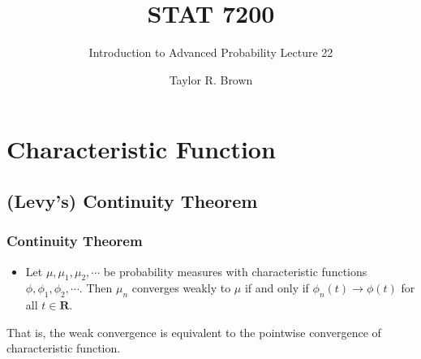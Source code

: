 \documentclass[handout]{beamer}
\title{STAT 7200}
\subtitle{Introduction to Advanced Probability \newline Lecture 22}
\author{Taylor R. Brown}
\institute{}
\date{}
\begin{document}
\frame{\titlepage}


\section[Outline]{}
\frame{\tableofcontents}



\section{Characteristic Function}


\subsection{(Levy's) Continuity Theorem} 


\frame
{
  \frametitle{Continuity Theorem} 

 \begin{itemize}
 
            \item<1->[] \begin{Theorem} Let $\mu, \mu_1, \mu_2,\cdots$  be probability measures with characteristic functions $\phi, \phi_1, \phi_2,\cdots$. Then $\mu_n$ converges weakly to $\mu$ if and only if $\phi_n(t)\rightarrow \phi(t)$ for all $t \in \mathbf{R}$.  
            \end{Theorem}

% 

\end{itemize}
That is, the weak convergence is equivalent to the pointwise convergence of characteristic function. 
}
\end{document}
